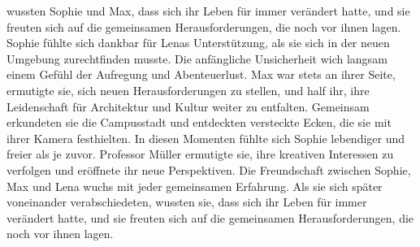 \documentclass[12pt]{article} %
\begin{document}
wussten Sophie und Max, dass sich ihr Leben für immer verändert hatte, und sie freuten sich auf die gemeinsamen Herausforderungen, die noch vor ihnen lagen. Sophie fühlte sich dankbar für Lenas Unterstützung, als sie sich in der neuen Umgebung zurechtfinden musste. Die anfängliche Unsicherheit wich langsam einem Gefühl der Aufregung und Abenteuerlust. Max war stets an ihrer Seite, ermutigte sie, sich neuen Herausforderungen zu stellen, und half ihr, ihre Leidenschaft für Architektur und Kultur weiter zu entfalten. Gemeinsam erkundeten sie die Campusstadt und entdeckten versteckte Ecken, die sie mit ihrer Kamera festhielten. In diesen Momenten fühlte sich Sophie lebendiger und freier als je zuvor. Professor Müller ermutigte sie, ihre kreativen Interessen zu verfolgen und eröffnete ihr neue Perspektiven. Die Freundschaft zwischen Sophie, Max und Lena wuchs mit jeder gemeinsamen Erfahrung. Als sie sich später voneinander verabschiedeten, wussten sie, dass sich ihr Leben für immer verändert hatte, und sie freuten sich auf die gemeinsamen Herausforderungen, die noch vor ihnen lagen.
\end{document}
